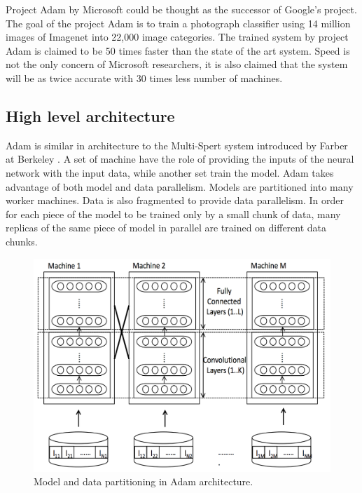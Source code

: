 \documentclass[runningheads,a4paper]{llncs}
\begin{document}
Project Adam by Microsoft could be thought as the successor of Google's project. The goal of the project Adam is to train a photograph classifier using 14 million images of Imagenet \cite{deng2009imagenet} into 22,000 image categories. The trained system by project Adam is claimed to be 50 times faster than the state of the art system. Speed is not the only concern of Microsoft researchers, it is also claimed that the system will be as twice accurate with 30 times less number of machines.\\

\subsection*{High level architecture}
Adam is similar in architecture to the Multi-Spert system introduced by Farber at Berkeley \cite{farber1997parallel}. A set of machine have the role of providing the inputs of the neural network with the input data, while another set train the model. Adam takes advantage of both model and data parallelism. Models are partitioned into many worker machines. Data is also fragmented to provide data parallelism. In order for each piece of the model to be trained only by a small chunk of data, many replicas of the same piece of model in parallel are trained on different data chunks.\\
\begin{figure}[h]
	\includegraphics[scale=0.3]{./images/adam_parallelization.png}
	\centering
	\caption{Model and data partitioning in Adam architecture\cite{chilimbi2014project}.}
	\label{fig:adam_parallelism}
\end{figure}
\end{document}
